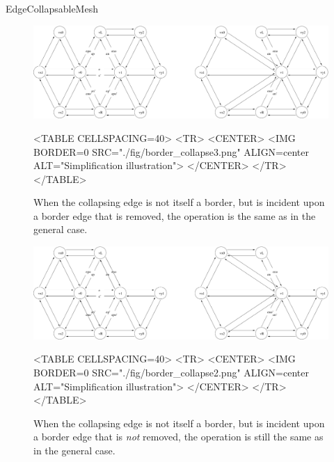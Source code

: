 \begin{ccRefConcept}{EdgeCollapsableMesh}
\begin{figure}[htbp]
\begin{ccTexOnly}
\begin{center}
\includegraphics[width=17cm]{Surface_mesh_simplification_ref/fig/border_collapse3} %
\end{center}
\end{ccTexOnly}
\begin{ccHtmlOnly}
<TABLE CELLSPACING=40>
<TR>
<CENTER>
<IMG BORDER=0 SRC="./fig/border_collapse3.png" ALIGN=center ALT="Simplification illustration">
</CENTER>
</TR>
</TABLE>
\end{ccHtmlOnly}
\caption{When the collapsing edge is not itself a border, but is incident upon a border edge that is removed, the operation is the same as in the general case.}
\end{figure}

\begin{figure}[htbp]
\begin{ccTexOnly}
\begin{center}
\includegraphics[width=17cm]{Surface_mesh_simplification_ref/fig/border_collapse2} %
\end{center}
\end{ccTexOnly}
\begin{ccHtmlOnly}
<TABLE CELLSPACING=40>
<TR>
<CENTER>
<IMG BORDER=0 SRC="./fig/border_collapse2.png" ALIGN=center ALT="Simplification illustration">
</CENTER>
</TR>
</TABLE>
\end{ccHtmlOnly}
\caption{When the collapsing edge is not itself a border, but is incident upon a border edge that is {\em not} removed, the operation is still the same as in the general case.}
\end{figure}


\end{ccRefConcept}
